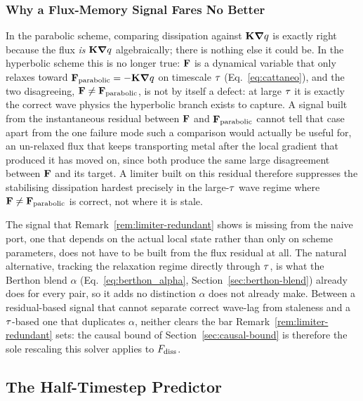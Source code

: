\subsubsection{Why a Flux-Memory Signal Fares No Better}
\label{sec:limiter-flux-memory}
In the parabolic scheme, comparing dissipation against $\mathbf{K}\grad q$
is exactly right because the flux \emph{is} $\mathbf{K}\grad q$
algebraically; there is nothing else it could be. In the hyperbolic
scheme this is no longer true: $\mathbf{F}$ is a dynamical variable that only
relaxes toward $\mathbf{F}_{\rm parabolic}=-\mathbf{K}\grad q$ on timescale
$\tau$ (Eq.~\eqref{eq:cattaneo}), and the two disagreeing,
$\mathbf{F}\neq\mathbf{F}_{\rm parabolic}$, is not by itself a defect: at large
$\tau$ it is exactly the correct wave physics the hyperbolic branch
exists to capture. A signal built from the instantaneous residual between
$\mathbf{F}$ and $\mathbf{F}_{\rm parabolic}$ cannot tell that case apart from the
one failure mode such a comparison would actually be useful for, an
un-relaxed flux that keeps transporting metal after the local gradient
that produced it has moved on, since both produce the same large
disagreement between $\mathbf{F}$ and its target. A limiter built on this
residual therefore suppresses the stabilising dissipation hardest
precisely in the large-$\tau$ wave regime where $\mathbf{F}\neq\mathbf{F}_{\rm
parabolic}$ is correct, not where it is stale.

The signal that Remark~\ref{rem:limiter-redundant} shows is missing from
the naive port, one that depends on the actual local state rather than
only on scheme parameters, does not have to be built from the flux
residual at all. The natural alternative, tracking the relaxation regime
directly through $\tau$, is what the Berthon blend $\alpha$
(Eq.~\eqref{eq:berthon_alpha}, Section~\ref{sec:berthon-blend}) already
does for every pair, so it adds no distinction $\alpha$ does not already
make. Between a residual-based signal that cannot separate correct
wave-lag from staleness and a $\tau$-based one that duplicates
$\alpha$, neither clears the bar Remark~\ref{rem:limiter-redundant} sets:
the causal bound of Section~\ref{sec:causal-bound} is therefore the sole
rescaling this solver applies to $F_{\rm diss}$.

\subsection{The Half-Timestep Predictor}
\label{sec:predictor}

